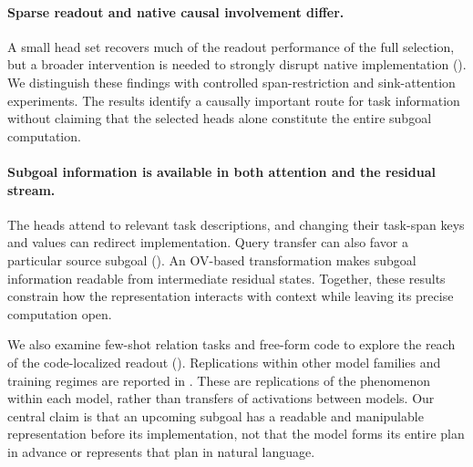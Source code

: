 \paragraph{Sparse readout and native causal involvement differ.}
A small head set recovers much of the readout performance of the full selection, but a broader intervention is needed to strongly disrupt native implementation (). We distinguish these findings with controlled span-restriction and sink-attention experiments. The results identify a causally important route for task information without claiming that the selected heads alone constitute the entire subgoal computation.

\paragraph{Subgoal information is available in both attention and the residual stream.}
The heads attend to relevant task descriptions, and changing their task-span keys and values can redirect implementation. Query transfer can also favor a particular source subgoal (). An OV-based transformation makes subgoal information readable from intermediate residual states. Together, these results constrain how the representation interacts with context while leaving its precise computation open.

We also examine few-shot relation tasks and free-form code to explore the reach of the code-localized readout (). Replications within other model families and training regimes are reported in . These are replications of the phenomenon within each model, rather than transfers of activations between models. Our central claim is that an upcoming subgoal has a readable and manipulable representation before its implementation, not that the model forms its entire plan in advance or represents that plan in natural language.
